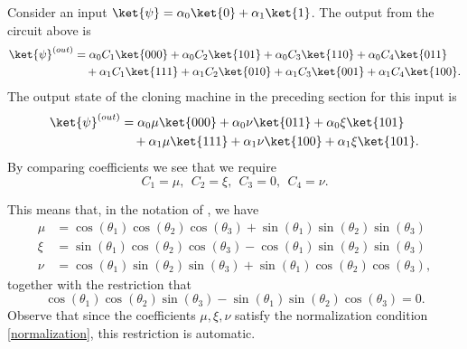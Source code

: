 \documentclass[reqno]{amsart}
\numberwithin{lemma}{section}
\numberwithin{proposition}{section}
\begin{document}
Consider an input $\ket{\psi} = \alpha_{0} \ket{0} + \alpha_{1} \ket{1}$. The output from the circuit above is
\begin{align*}
    \ket{\psi}^{(out)} &= \alpha_{0} C_{1} \ket{000} + \alpha_{0} C_{2} \ket{101} + \alpha_{0} C_{3} \ket{110} + \alpha_{0} C_{4} \ket{011} \\
    & \quad + \alpha_{1} C_{1} \ket{111} + \alpha_{1} C_{2} \ket{010} + \alpha_{1} C_{3} \ket{001} + \alpha_{1} C_{4} \ket{100}.
\end{align*}
The output state of the cloning machine in the preceding section for this input is
\begin{align*}
    \ket{\psi}^{(out)} &= \alpha_{0} \mu \ket{000} + \alpha_{0} \nu \ket{011} + \alpha_{0} \xi \ket{101} \\
    & \quad + \alpha_{1} \mu \ket{111} + \alpha_{1} \nu \ket{100} + \alpha_{1} \xi \ket{101}.
\end{align*}
By comparing coefficients we see that we require
\begin{equation*}
    C_{1} = \mu, \ \ C_{2} = \xi, \ \ C_{3} = 0, \ \ C_{4} = \nu.
\end{equation*}


This means that, in the notation of \cite{REZAKHANI2005278}, we have
\begin{align*}
	\mu  &= \cos(\theta_{1}) \cos(\theta_{2}) \cos(\theta_{3}) + \sin(\theta_{1}) \sin(\theta_{2}) \sin(\theta_{3})\\
	\xi &= \sin(\theta_{1}) \cos(\theta_{2}) \cos(\theta_{3}) - \cos(\theta_{1}) \sin(\theta_{2}) \sin(\theta_{3})\\
	\nu &= \cos(\theta_{1}) \sin(\theta_{2}) \sin(\theta_{3}) + \sin(\theta_{1}) \cos(\theta_{2}) \cos(\theta_{3}),
\end{align*}
together with the restriction that
\begin{equation*}
	\cos(\theta_{1}) \cos(\theta_{2}) \sin(\theta_{3}) - \sin(\theta_{1}) \sin(\theta_{2}) \cos(\theta_{3}) = 0.
\end{equation*}
Observe that since the coefficients $\mu, \xi, \nu$ satisfy the normalization condition \eqref{normalization}, this restriction is automatic.






\end{document}
